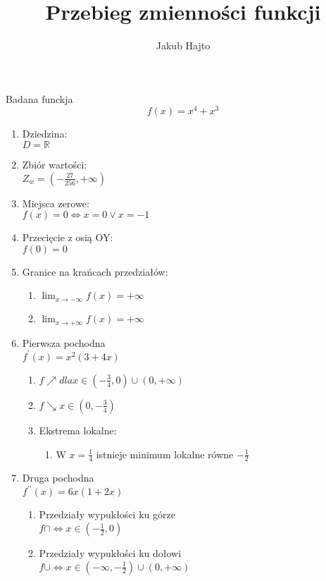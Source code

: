 \documentclass[11pt]{scrartcl}
\title{Przebieg zmienności funkcji}
\author{Jakub Hajto}
\begin{document}
\maketitle
\begin{center}
	Badana funckja $$ f(x) = x^4 + x^3 $$
\end{center}
\begin{enumerate}
\item Dziedzina: \\
	$ D = \mathbb{R} $
\item Zbiór wartości: \\
	$ Z_w = (-\frac{27}{256}, +\infty) $
\item Miejsca zerowe: \\
	$ f(x) = 0 \Longleftrightarrow  x = 0 \vee x = -1 $
\item Przecięcie z osią OY: \\
	$ f(0) = 0 $
\item Granice na krańcach przedziałów:
	\begin{enumerate}
	\item $ \lim_{x\to-\infty} f(x) = + \infty $
	\item $ \lim_{x\to+\infty} f(x) = + \infty $
	\end{enumerate}
\item Pierwsza pochodna \\
	$ f^{\prime}(x) = x^2 (3 + 4 x) $
  \begin{enumerate}
  \item $ f\nearrow dla x \in (-\frac{3}{4}, 0) \cup (0, + \infty) $
	\item $ f\searrow x \in ( 0, -\frac{3}{4}) $
	\item Ekstrema lokalne:
		\begin{enumerate}
		\item W $ x = \frac{1}{4} $ istnieje minimum lokalne równe $ -\frac{1}{2} $
		\end{enumerate}
  \end{enumerate}
\item Druga pochodna \\
	$ f^{\prime\prime}(x) = 6 x (1 + 2 x) $
	\begin{enumerate}
	\item Przedziały wypukłości ku górze \\
		$ f\cap \Leftrightarrow x \in (- \frac{1}{2},0) $
	\item Przedziały wypukłości ku dołowi \\
		$ f\cup \Leftrightarrow x \in (-\infty, - \frac{1}{2}) \cup (0, +\infty) $

\end{enumerate}
\end{enumerate}
\end{document}
